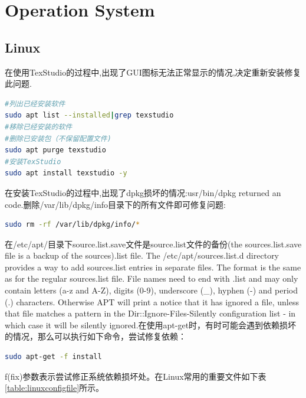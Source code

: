 \documentclass[12pt]{book}
\numberwithin{dummy}{section}
\theoremstyle{ocrenumbox}
\theoremstyle{blacknumex}
\theoremstyle{blacknumbox}
\theoremstyle{ocrenum}
\begin{document}
\clearpage

\part{Operation System}

\chapter{Linux}

在使用TexStudio的过程中,出现了GUI图标无法正常显示的情况,决定重新安装修复此问题.

\begin{lstlisting}[language=Bash]
#列出已经安装软件
sudo apt list --installed|grep texstudio
#移除已经安装的软件
#删除已安装包（不保留配置文件)
sudo apt purge texstudio
#安装TexStudio
sudo apt install texstudio -y 
\end{lstlisting}

在安装TexStudio的过程中,出现了dpkg损坏的情况:usr/bin/dpkg returned an code.删除/var/lib/dpkg/info目录下的所有文件即可修复问题:

\begin{lstlisting}[language=Bash]
sudo rm -rf /var/lib/dpkg/info/*
\end{lstlisting}

在/etc/apt/目录下source.list.save文件是source.list文件的备份(the sources.list.save file is a backup of the sources).list file. The /etc/apt/sources.list.d directory provides a way to add sources.list entries in separate files. The format is the same as for the regular sources.list file. File names need to end with .list and may only contain letters (a-z and A-Z), digits (0-9), underscore (\_), hyphen (-) and period (.) characters. Otherwise APT will print a notice that it has ignored a file, unless that file matches a pattern in the Dir::Ignore-Files-Silently configuration list - in which case it will be silently ignored.在使用apt-get时，有时可能会遇到依赖损坏的情况，那么可以执行如下命令，尝试修复依赖：

\begin{lstlisting}[language=Bash]
sudo apt-get -f install 
\end{lstlisting}

f(fix)参数表示尝试修正系统依赖损坏处。在Linux常用的重要文件如下表\ref{table:linuxconfigfile}所示。
\end{document}

